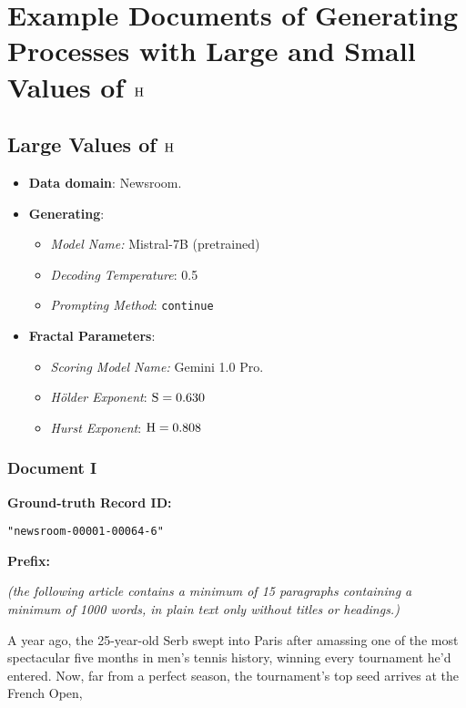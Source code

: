\newpage

\section{Example Documents of Generating Processes with Large and Small Values of $\mathrm{H}$ }\label{sect:app:rho_doc_sample}

\subsection{Large Values of $\mathrm{H}$}
\begin{itemize}
    \item\textbf{Data domain}: Newsroom.
    \item\textbf{Generating}: 
        \begin{itemize}
            \item\emph{Model Name:} Mistral-7B (pretrained)
            \item\emph{Decoding Temperature}: 0.5
            \item\emph{Prompting Method}: \verb|continue|
        \end{itemize}
    \item\textbf{Fractal Parameters}: 
        \begin{itemize}
            \item\emph{Scoring Model Name:} Gemini 1.0 Pro.
            \item\emph{H\"older Exponent}: $\mathrm{S}=0.630$
            \item\emph{Hurst Exponent}:  $\mathrm{H}=0.808$
        \end{itemize}
\end{itemize}
\subsubsection{Document I}
{\bf\ttfamily Ground-truth Record ID:}
\begin{lstlisting}[basicstyle=\footnotesize\ttfamily]
"newsroom-00001-00064-6"
\end{lstlisting}

{\bf\ttfamily Prefix: }

{\ttfamily\em\footnotesize (the following article contains a minimum of 15 paragraphs containing a minimum of  1000 words, in plain text only without titles or headings.)

A year ago, the 25-year-old Serb swept into Paris after amassing one of the most spectacular five months in men's tennis history, winning every tournament he'd entered. Now, far from a perfect season, the tournament's top seed arrives at the French Open,
}

